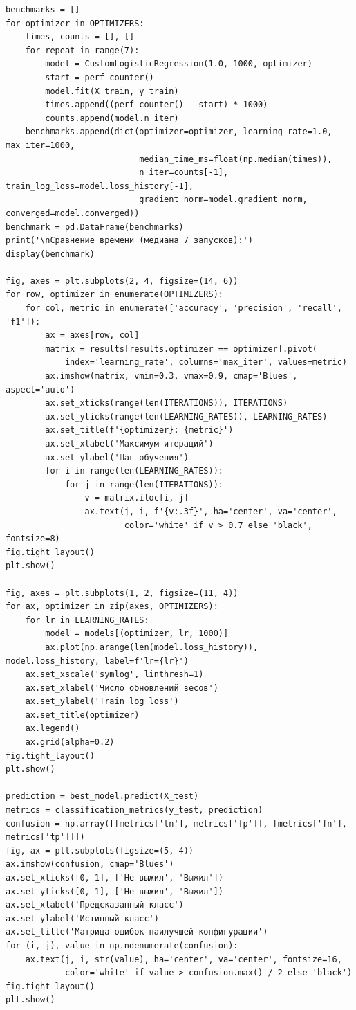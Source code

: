 \documentclass[a4paper,12pt]{article}
\begin{document}
\begin{verbatim}
benchmarks = []
for optimizer in OPTIMIZERS:
    times, counts = [], []
    for repeat in range(7):
        model = CustomLogisticRegression(1.0, 1000, optimizer)
        start = perf_counter()
        model.fit(X_train, y_train)
        times.append((perf_counter() - start) * 1000)
        counts.append(model.n_iter)
    benchmarks.append(dict(optimizer=optimizer, learning_rate=1.0, max_iter=1000,
                           median_time_ms=float(np.median(times)),
                           n_iter=counts[-1], train_log_loss=model.loss_history[-1],
                           gradient_norm=model.gradient_norm, converged=model.converged))
benchmark = pd.DataFrame(benchmarks)
print('\nСравнение времени (медиана 7 запусков):')
display(benchmark)

fig, axes = plt.subplots(2, 4, figsize=(14, 6))
for row, optimizer in enumerate(OPTIMIZERS):
    for col, metric in enumerate(['accuracy', 'precision', 'recall', 'f1']):
        ax = axes[row, col]
        matrix = results[results.optimizer == optimizer].pivot(
            index='learning_rate', columns='max_iter', values=metric)
        ax.imshow(matrix, vmin=0.3, vmax=0.9, cmap='Blues', aspect='auto')
        ax.set_xticks(range(len(ITERATIONS)), ITERATIONS)
        ax.set_yticks(range(len(LEARNING_RATES)), LEARNING_RATES)
        ax.set_title(f'{optimizer}: {metric}')
        ax.set_xlabel('Максимум итераций')
        ax.set_ylabel('Шаг обучения')
        for i in range(len(LEARNING_RATES)):
            for j in range(len(ITERATIONS)):
                v = matrix.iloc[i, j]
                ax.text(j, i, f'{v:.3f}', ha='center', va='center',
                        color='white' if v > 0.7 else 'black', fontsize=8)
fig.tight_layout()
plt.show()

fig, axes = plt.subplots(1, 2, figsize=(11, 4))
for ax, optimizer in zip(axes, OPTIMIZERS):
    for lr in LEARNING_RATES:
        model = models[(optimizer, lr, 1000)]
        ax.plot(np.arange(len(model.loss_history)), model.loss_history, label=f'lr={lr}')
    ax.set_xscale('symlog', linthresh=1)
    ax.set_xlabel('Число обновлений весов')
    ax.set_ylabel('Train log loss')
    ax.set_title(optimizer)
    ax.legend()
    ax.grid(alpha=0.2)
fig.tight_layout()
plt.show()

prediction = best_model.predict(X_test)
metrics = classification_metrics(y_test, prediction)
confusion = np.array([[metrics['tn'], metrics['fp']], [metrics['fn'], metrics['tp']]])
fig, ax = plt.subplots(figsize=(5, 4))
ax.imshow(confusion, cmap='Blues')
ax.set_xticks([0, 1], ['Не выжил', 'Выжил'])
ax.set_yticks([0, 1], ['Не выжил', 'Выжил'])
ax.set_xlabel('Предсказанный класс')
ax.set_ylabel('Истинный класс')
ax.set_title('Матрица ошибок наилучшей конфигурации')
for (i, j), value in np.ndenumerate(confusion):
    ax.text(j, i, str(value), ha='center', va='center', fontsize=16,
            color='white' if value > confusion.max() / 2 else 'black')
fig.tight_layout()
plt.show()
\end{verbatim}
\end{document}
